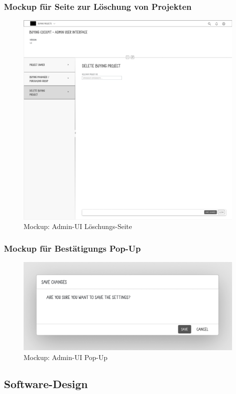 \subsubsection[Mockup für Seite zur Löschung von Projekten]{Mockup für Seite zur Löschung von Projekten}
\begin{figure}[H]
    \centering
    \includegraphics[width=\linewidth]{Images/Mockup_DEL_anonym.png}
    \caption[Mockup: Admin-UI Löschungs-Seite]{Mockup: Admin-UI Löschungs-Seite}
\end{figure}

\subsubsection[Mockup für Bestätigungs Pop-Up]{Mockup für Bestätigungs Pop-Up}
\begin{figure}[H]
    \centering
    \includegraphics[width=\linewidth]{Images/Mockup_PopUp.png}
    \caption[Mockup: Admin-UI Pop-Up]{Mockup: Admin-UI Pop-Up}
\end{figure}





\subsection[Software-Design]{Software-Design}

